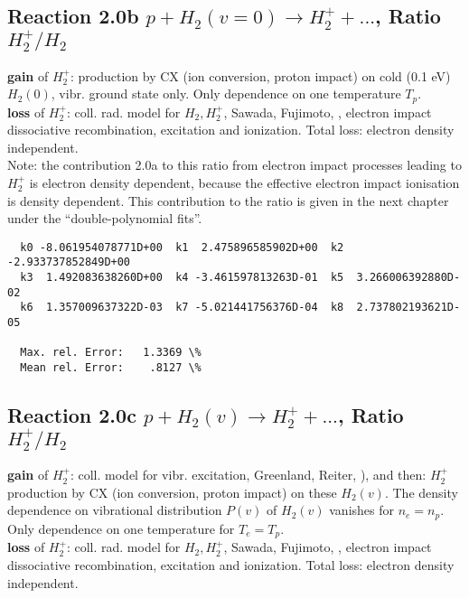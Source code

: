 \documentclass[12pt,dvipdfmx]{article}
\begin{document}
\subsection{
Reaction 2.0b     $ p + H_2(v=0) \rightarrow  H_2^+ + ... $, Ratio  \ $H_2^+/H_2$
}
\textbf{gain }of $H_2^+$:
production by CX (ion conversion, proton impact) on cold (0.1 eV) $H_2(0)$, vibr. ground state only.
Only dependence on one temperature  $T_p$.
\\
\textbf{loss }of $H_2^+$: coll. rad. model for $H_2, H_2^+$, Sawada, Fujimoto, \cite{kn:Sawada},
electron impact dissociative recombination, excitation and ionization. Total loss: electron density independent.\\

Note: the contribution 2.0a to this ratio from electron impact processes leading to $H_2^+$ is electron density dependent,
because the effective electron impact ionisation is density dependent.
This contribution to the ratio is given in the next chapter under the ``double-polynomial fits''.
\medskip


\begin{small}\begin{verbatim}
  k0 -8.061954078771D+00  k1  2.475896585902D+00  k2 -2.933737852849D+00
  k3  1.492083638260D+00  k4 -3.461597813263D-01  k5  3.266006392880D-02
  k6  1.357009637322D-03  k7 -5.021441756376D-04  k8  2.737802193621D-05

  Max. rel. Error:   1.3369 \%
  Mean rel. Error:    .8127 \%

\end{verbatim}\end{small}

\subsection{
Reaction 2.0c   $p + H_2(v) \rightarrow H_2^+ + ... $, Ratio  \ $H_2^+/H_2$
}
\textbf{gain }of $H_2^+$: coll. model for vibr. excitation, Greenland, Reiter, \cite{kn:Green}),
and then: $H_2^+$ production by CX (ion conversion, proton impact) on these $H_2(v)$.
The density dependence on vibrational distribution $P(v)$ of $H_2(v)$ vanishes for $n_e=n_p$.
Only dependence on one temperature for $T_e=T_p$.
\\
\textbf{loss }of $H_2^+$: coll. rad. model for $H_2, H_2^+$, Sawada, Fujimoto, \cite{kn:Sawada},
electron impact dissociative recombination, excitation and ionization. Total loss: electron density independent.\\
\end{document}
